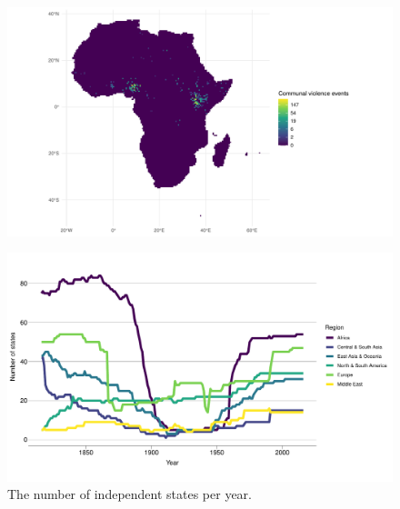 \documentclass{beamer}
\begin{document}
\begin{frame}
	\begin{figure}
		\includegraphics[width=\linewidth]{../R/Output/logOrg3.pdf}
	\end{figure}
\end{frame}


\begin{frame}
\end{frame}

\begin{frame}
	\begin{figure}
		\includegraphics[width=\textwidth]{../R/Output/statesPerYear.pdf}
		\caption{The number of independent states per year.}
		\label{statesperyear}
	\end{figure}
\end{frame}


\begin{frame}
\end{frame}
\end{document}
